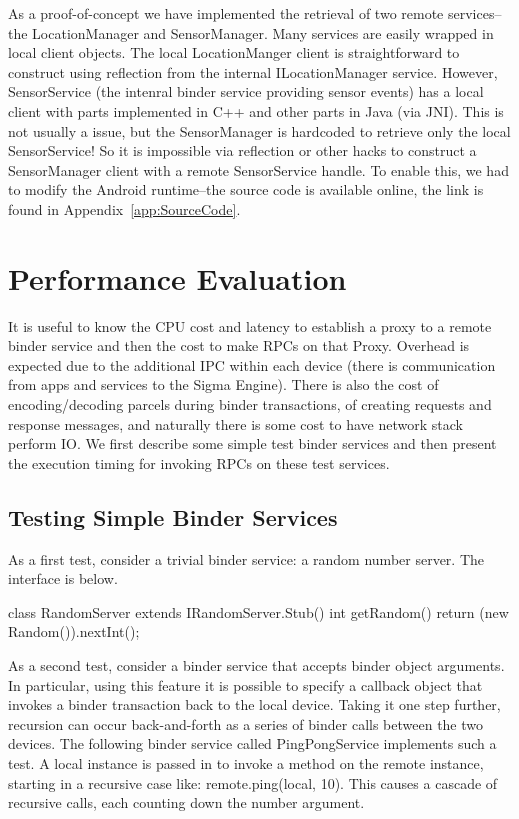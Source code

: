 \documentclass[prodmode]{acmlarge}
\begin{document}
As a proof-of-concept we have implemented the retrieval of two remote services--the LocationManager and SensorManager. Many services are easily wrapped in local client objects. The local LocationManger client is straightforward to construct using reflection from the internal ILocationManager service. However, SensorService (the intenral binder service providing sensor events) has a local client with parts implemented in C++ and other parts in Java (via JNI). This is not usually a issue, but the SensorManager is hardcoded to retrieve only the local SensorService! So it is impossible via reflection or other hacks to construct a SensorManager client with a remote SensorService handle. To enable this, we had to modify the Android runtime--the source code is available online, the link is found in Appendix~\ref{app:SourceCode}.

\section{Performance Evaluation}
\label{sec:Performance}
It is useful to know the CPU cost and latency to establish a proxy to a remote binder service and then the cost to make RPCs on that Proxy. Overhead is expected due to the additional IPC within each device (there is communication from apps and services to the Sigma Engine). There is also the cost of encoding/decoding parcels during binder transactions, of creating requests and response messages, and naturally there is some cost to have network stack perform IO. We first describe some simple test binder services and then present the execution timing for invoking RPCs on these test services.

\subsection{Testing Simple Binder Services}
As a first test, consider a trivial binder service: a random number server. The interface is below.

\begin{snippet}
class RandomServer extends IRandomServer.Stub() {
  int getRandom() {
    return (new Random()).nextInt(); }
}
\end{snippet}

As a second test, consider a binder service that accepts binder object arguments. In particular, using this feature it is possible to specify a callback object that invokes a binder transaction back to the local device. Taking it one step further, recursion can occur back-and-forth as a series of binder calls between the two devices. The following binder service called PingPongService implements such a test. A local instance is passed in to invoke a method on the remote instance, starting in a recursive case like: remote.ping(local, 10). This causes a cascade of recursive calls, each counting down the number argument.
\end{document}
